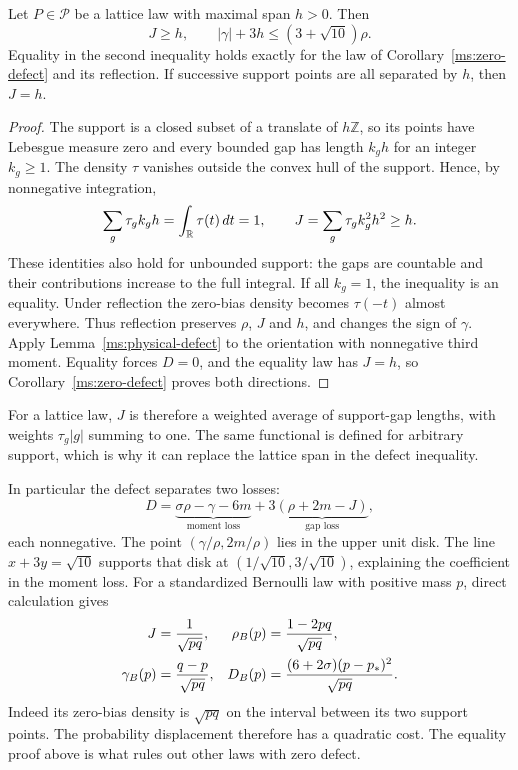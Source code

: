 \begin{corollary}\label{opus:lattice-gap}
Let $P\in\mathcal P$ be a lattice law with maximal span $h>0$. Then
\[
 J\ge h,\qquad |\gamma|+3h\le(3+\sqrt{10})\rho.
\]
Equality in the second inequality holds exactly for the law of
Corollary~\ref{ms:zero-defect} and its reflection. If successive support
points are all separated by $h$, then $J=h$.
\end{corollary}
\begin{proof}
The support is a closed subset of a translate of $h\mathbb Z$, so its
points have Lebesgue measure zero and every bounded gap has length
$k_gh$ for an integer $k_g\ge1$. The density $\tau$ vanishes outside
the convex hull of the support. Hence, by nonnegative integration,
\[
 \sum_g\tau_gk_gh=\int_\mathbb R\tau(t)\,dt=1,
 \qquad J=\sum_g\tau_gk_g^2h^2\ge h.
\]
These identities also hold for unbounded support: the gaps are
countable and their contributions increase to the full integral.
If all $k_g=1$, the inequality is an equality. Under reflection the
zero-bias density becomes $\tau(-t)$ almost everywhere. Thus reflection
preserves $\rho$, $J$ and $h$, and changes the sign of $\gamma$. Apply
Lemma~\ref{ms:physical-defect} to the orientation with nonnegative
third moment. Equality forces $D=0$, and the equality law has
$J=h$, so Corollary~\ref{ms:zero-defect} proves both directions.
\end{proof}
For a lattice law, $J$ is therefore a weighted average of support-gap
lengths, with weights $\tau_g|g|$ summing to one. The same functional
is defined for arbitrary support, which is why it can replace the
lattice span in the defect inequality.

In particular the defect separates two losses:
\[
 D=\underbrace{\sigma\rho-\gamma-6m}_{\text{moment loss}}
       +3\underbrace{(\rho+2m-J)}_{\text{gap loss}},
\]
each nonnegative. The point $(\gamma/\rho,2m/\rho)$ lies in the upper
unit disk. The line $x+3y=\sqrt{10}$ supports that disk at
$(1/\sqrt{10},3/\sqrt{10})$, explaining the coefficient in the moment
loss. For a standardized Bernoulli law with positive mass $p$, direct
calculation gives
\begin{align}
 J&=\frac1{\sqrt{pq}},&
 \rho_B(p)&=\frac{1-2pq}{\sqrt{pq}},\notag\\
 \gamma_B(p)&=\frac{q-p}{\sqrt{pq}},&
 D_B(p)&=\frac{(6+2\sigma)(p-p_*)^2}{\sqrt{pq}}.
 \label{ms:bernoulli-defect}
\end{align}
Indeed its zero-bias density is $\sqrt{pq}$ on the interval between its
two support points. The probability displacement therefore has a
quadratic cost. The equality proof above is what rules out other laws
with zero defect.

